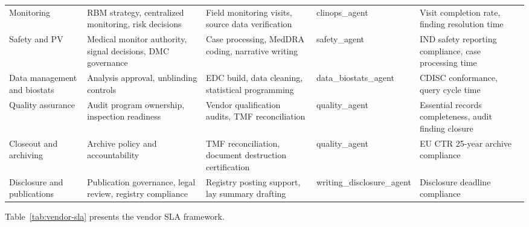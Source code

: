 \begin{longtable}{L{1.8cm} L{2.5cm} L{2.5cm} L{1.8cm} L{2.8cm}}
Monitoring & RBM strategy, centralized monitoring, risk decisions & Field monitoring visits, source data verification & clinops\_agent & Visit completion rate, finding resolution time \\
Safety and PV & Medical monitor authority, signal decisions, DMC governance & Case processing, MedDRA coding, narrative writing & safety\_agent & IND safety reporting compliance, case processing time \\
Data management and biostats & Analysis approval, unblinding controls & EDC build, data cleaning, statistical programming & data\_biostats\_agent & CDISC conformance, query cycle time \\
Quality assurance & Audit program ownership, inspection readiness & Vendor qualification audits, TMF reconciliation & quality\_agent & Essential records completeness, audit finding closure \\
Closeout and archiving & Archive policy and accountability & TMF reconciliation, document destruction certification & quality\_agent & EU CTR 25-year archive compliance \\
Disclosure and publications & Publication governance, legal review, registry compliance & Registry posting support, lay summary drafting & writing\_disclosure\_agent & Disclosure deadline compliance \\
\end{longtable}

Table~\ref{tab:vendor-sla} presents the vendor SLA framework.

